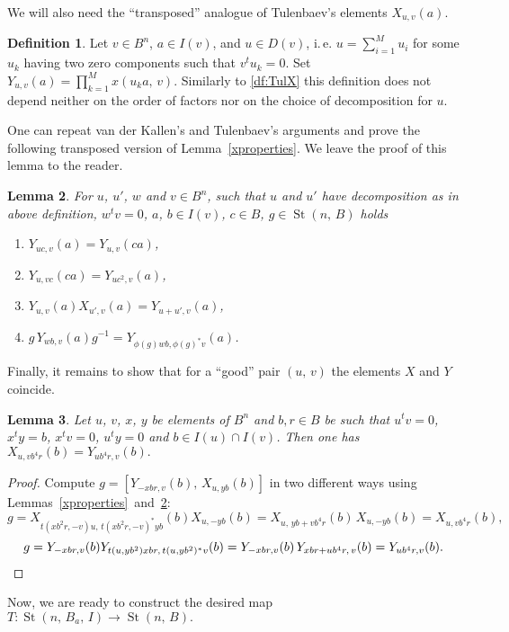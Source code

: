 \documentclass[11pt]{amsart}
\theoremstyle{plain} \declaretheorem[name=Theorem, Refname={Theorem,Theorems}]{tm} \Crefname{tm}{Theorem}{Theorems}
\numberwithin{equation}{section}
\newtheorem{lm}{Lemma} \numberwithin{lm}{section} \Crefname{lm}{Lemma}{Lemmas}
\theoremstyle{definition} \newtheorem{df}[lm]{Definition} \Crefname{df}{Definition}{Definitions}
\theoremstyle{remark} \newtheorem{rk}[lm]{Remark} \Crefname{rk}{Remark}{Remarks}
\newcommand{\St}{\mathop{\mathrm{St}}\nolimits}
\newcommand{\inv}{^{-1}}
\begin{document}
We will also need the ``transposed'' analogue of Tulenbaev's elements $X_{u,v}(a)$.
\begin{df} \label{df:TulY}
Let $v\in B^n$, $a\in I(v)$, and $u \in D(v)$, i.\,e. $u = \sum\limits_{i=1}^M u_i$ for some $u_k$ having two zero components such that $v^tu_k=0$.
Set $Y_{u,v}(a)=\prod_{k=1}^Mx(u_ka,\,v)$. 
Similarly to \cref{df:TulX} this definition does not depend neither on the order of factors nor on the choice of decomposition for $u$.
\end{df}

One can repeat van der Kallen's and Tulenbaev's arguments and prove the following transposed version of Lemma~\ref{xproperties}.
We leave the proof of this lemma to the reader.
\begin{lm}
\label{yproperties}
For $u$, $u'$, $w$ and $v\in B^n$, such that $u$ and $u'$ have decomposition as in above definition, $w^tv=0$, $a$, $b\in I(v)$, $c\in B$, $g\in\St(n,\,B)$ holds
\begin{enumerate}
\item $Y_{uc,v}(a)=Y_{u,v}(ca)$,
\item $Y_{u,vc}(ca)=Y_{uc^2,v}(a)$,
\item $Y_{u,v}(a)X_{u',v}(a)=Y_{u+u',v}(a)$,
\item $g\,Y_{wb,v}(a)g\inv=Y_{\phi(g)wb,\phi(g)^*v}(a)$.
\end{enumerate}
\end{lm}

Finally, it remains to show that for a ``good'' pair $(u,\,v)$ the elements $X$ and $Y$ coincide.
\begin{lm}\label{x=y}
Let $u$, $v$, $x$, $y$ be elements of $B^n$ and $b,r\in B$ be such that $u^t v = 0$, $x^ty=b$, $x^tv=0$, $u^ty=0$ and $b\in I(u)\cap I(v)$.
Then one has $X_{u,vb^4r}(b)=Y_{ub^4r,v}(b).$
\end{lm}
\begin{proof}
Compute $g=[Y_{-xbr,v}(b),\,X_{u,yb}(b)]$ in two different ways using Lemmas~\ref{xproperties}~and~\ref{yproperties}:
$$ g = X_{t(xb^2r,-v)u,\,t(xb^2r,-v)^*yb}(b)X_{u,-yb}(b) = X_{u,\,yb+vb^4r}(b)\, X_{u,-yb}(b) = X_{u,vb^4r}(b),$$
$$ g = Y_{-xbr,v}(b) Y_{t(u,yb^2)xbr,\,t(u,yb^2)^*v}(b)= Y_{-xbr,v}(b)\, Y_{xbr+ub^4r,\,v}(b)=Y_{ub^4r,v}(b).\qedhere$$
\end{proof}

Now, we are ready to construct the desired map $T\colon\St(n,\,B_a,\,I)\rightarrow\St(n,\,B).$
\end{document}
